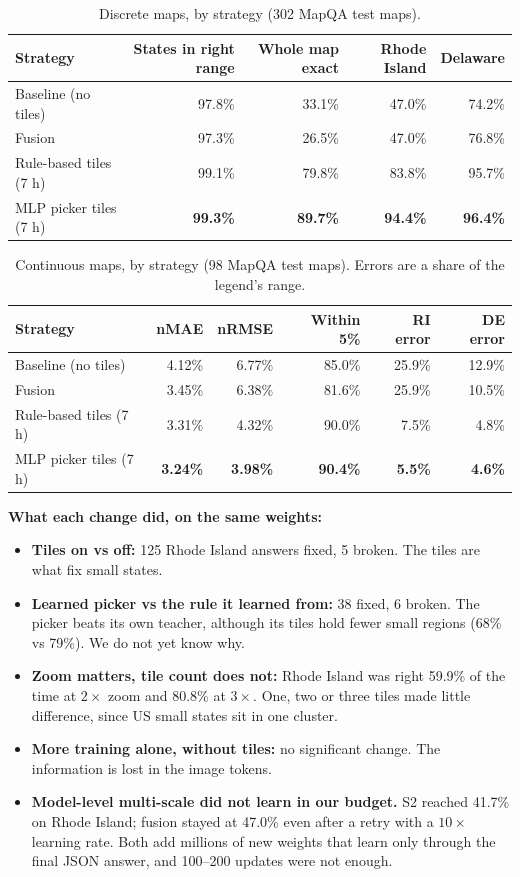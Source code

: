 \documentclass[11pt,a4paper]{article}
\begin{document}
\begin{table}[h]
\centering\small
\caption{Discrete maps, by strategy (302 MapQA test maps).}
\begin{tabular}{@{}lrrrr@{}}
\toprule
Strategy & States in right range & Whole map exact & Rhode Island & Delaware\\
\midrule
Baseline (no tiles) & 97.8\% & 33.1\% & 47.0\% & 74.2\%\\
Fusion & 97.3\% & 26.5\% & 47.0\% & 76.8\%\\
Rule-based tiles (7 h) & 99.1\% & 79.8\% & 83.8\% & 95.7\%\\
MLP picker tiles (7 h) & \textbf{99.3\%} & \textbf{89.7\%} & \textbf{94.4\%} & \textbf{96.4\%}\\
\bottomrule
\end{tabular}
\end{table}

\begin{table}[h]
\centering\small
\caption{Continuous maps, by strategy (98 MapQA test maps). Errors are a share of the legend's range.}
\begin{tabular}{@{}lrrrrr@{}}
\toprule
Strategy & nMAE & nRMSE & Within 5\% & RI error & DE error\\
\midrule
Baseline (no tiles) & 4.12\% & 6.77\% & 85.0\% & 25.9\% & 12.9\%\\
Fusion & 3.45\% & 6.38\% & 81.6\% & 25.9\% & 10.5\%\\
Rule-based tiles (7 h) & 3.31\% & 4.32\% & 90.0\% & 7.5\% & 4.8\%\\
MLP picker tiles (7 h) & \textbf{3.24\%} & \textbf{3.98\%} & \textbf{90.4\%} & \textbf{5.5\%} & \textbf{4.6\%}\\
\bottomrule
\end{tabular}
\end{table}

\textbf{What each change did, on the same weights:}
\begin{itemize}
\item \textbf{Tiles on vs off:} 125 Rhode Island answers fixed, 5 broken. The tiles are what fix small states.
\item \textbf{Learned picker vs the rule it learned from:} 38 fixed, 6 broken. The picker beats its own teacher, although its tiles hold fewer small regions (68\% vs 79\%). We do not yet know why.
\item \textbf{Zoom matters, tile count does not:} Rhode Island was right 59.9\% of the time at $2\times$ zoom and 80.8\% at $3\times$. One, two or three tiles made little difference, since US small states sit in one cluster.
\item \textbf{More training alone, without tiles:} no significant change. The information is lost in the image tokens.
\item \textbf{Model-level multi-scale did not learn in our budget.} S2 reached 41.7\% on Rhode Island; fusion stayed at 47.0\% even after a retry with a $10\times$ learning rate. Both add millions of new weights that learn only through the final JSON answer, and 100--200 updates were not enough.
\end{itemize}
\end{document}
